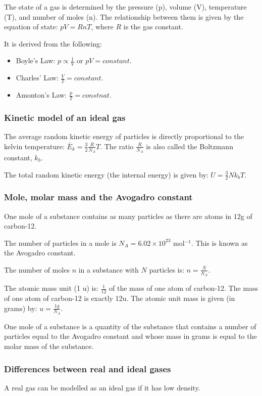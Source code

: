 The state of a gas is determined by the pressure (p), volume (V), temperature
(T), and number of moles (n). The relationship between them is given by the
equation of state: $pV = RnT$, where $R$ is the gas constant.

It is derived from the following:
\begin{itemize}
    \item Boyle's Law: $p \propto \frac{1}{V}$ or $pV = constant$.
    \item Charles' Law: $\frac{V}{T} = constant$.
    \item Amonton's Law: $\frac{p}{T} = constnat$.
\end{itemize}

\subsubsection{Kinetic model of an ideal gas}
The average random kinetic energy of particles is directly proportional to the
kelvin temperature: $\bar{E}_k = \frac{3}{2}\frac{R}{N_A}T$. The ratio
$\frac{R}{N_A}$ is also called the Boltzmann constant, $k_b$.

The total random kinetic energy (the internal energy) is given by:
$U = \frac{3}{2}Nk_bT$.

\subsubsection{Mole, molar mass and the Avogadro constant}
One mole of a substance contains as many particles as there are atoms in 12g of
carbon-12.

The number of particles in a mole is $N_A = 6.02 \times 10^{23}$ mol$^{-1}$.
This is known as the Avogadro constant.

The number of moles $n$ in a substance with $N$ particles is:
$n = \frac{N}{N_A}$.

The atomic mass unit (1 u) is: $\frac{1}{12}$ of the mass of one atom of
carbon-12. The mass of one atom of carbon-12 is exactly 12u. The atomic unit
mass is given (in grams) by: $u = \frac{1g}{N_A}$.

One mole of a substance is a quantity of the substance that contains a number
of particles equal to the Avogadro constant and whose mass in grams is equal to
the molar mass of the substance.

\subsubsection{Differences between real and ideal gases}
A real gas can be modelled as an ideal gas if it has low density.

